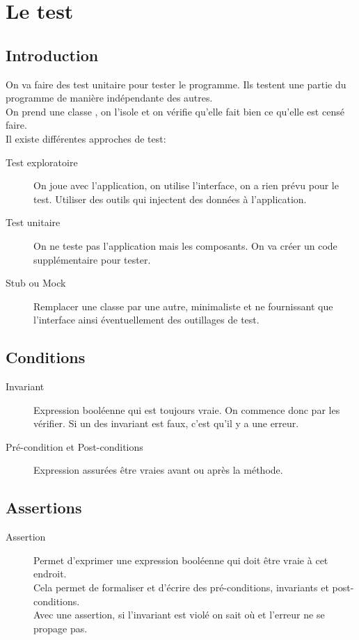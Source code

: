 \section{Le test}


\subsection{Introduction}
On va faire des test unitaire pour tester le programme. Ils testent une partie du programme de manière indépendante des autres.
\\On prend une classe , on l’isole et on vérifie qu’elle fait bien ce qu’elle est censé faire.
\\Il existe différentes approches de test:
\begin{description}
	\item [Test exploratoire] On joue avec l’application, on utilise l’interface, on a rien prévu pour le test. Utiliser des outils qui injectent des données à l’application.
	\item [Test unitaire] On ne teste pas l’application mais les composants. On va créer un code supplémentaire pour tester.
	\item [Stub ou Mock] Remplacer une classe par une autre, minimaliste et ne fournissant que l’interface ainsi éventuellement des outillages de test.
\end{description}


\subsection{Conditions}
\begin{description}
	\item [Invariant] Expression booléenne qui est toujours vraie. On commence donc par les vérifier. Si un des invariant est faux, c’est qu’il y a une erreur.
	\item [Pré-condition et Post-conditions] Expression assurées être vraies avant ou après la méthode.
\end{description}


\subsection{Assertions}
\begin{description}
	\item [Assertion] Permet d’exprimer une expression booléenne qui doit être vraie à cet endroit.
	\\Cela permet de formaliser et d’écrire des pré-conditions, invariants et post-conditions.
	\\Avec une assertion, si l’invariant est violé on sait où et l’erreur ne se propage pas.
\end{description}


